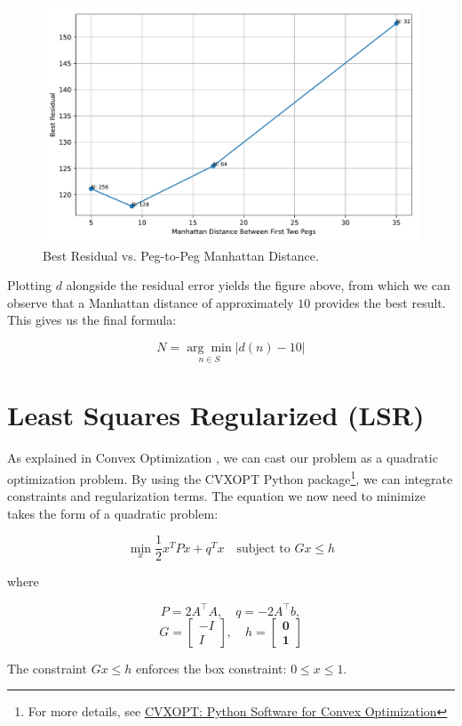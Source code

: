 \begin{figure}[H]
    \centering
    \includegraphics[width=0.5\linewidth]{images/tuning/lls_residuals_by_manhattan_distance.pdf}
    \caption{Best Residual vs. Peg-to-Peg Manhattan Distance.}
    \label{fig:residual_vs_manhattan}
\end{figure}

Plotting \(d\) alongside the residual error yields the figure above, from which we can observe that a Manhattan distance of approximately \(10\) provides the best result. This gives us the final formula:

\[
N = \underset{n \in S}{\arg\min} \left| d(n) - 10 \right|
\]

\section{Least Squares Regularized (LSR)}
\label{sec:lsr}

As explained in Convex Optimization \cite{convex-optimization}, we can cast our problem as a quadratic optimization problem. By using the CVXOPT Python package\footnote{For more details, see \href{https://cvxopt.org/}{CVXOPT: Python Software for Convex Optimization}}, we can integrate constraints and regularization terms. The equation we now need to minimize takes the form of a quadratic problem:

\begin{equation}
\label{eq:qp}
\min_{x} \frac{1}{2} x^TPx + q^Tx \quad \text{subject to } Gx \leq h
\end{equation}

where

\[
P = 2A^\top A, \quad q = -2A^\top b,
\]
\[
G = \begin{bmatrix}
-I \\
I
\end{bmatrix}, \quad
h = \begin{bmatrix}
\mathbf{0} \\
\mathbf{1}
\end{bmatrix}
\]

The constraint \( Gx \leq h \) enforces the box constraint: \(0 \leq x \leq 1\).

